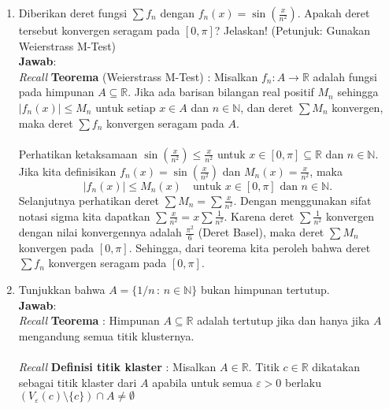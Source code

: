 \documentclass[a4paper, 12pt]{article}
\newcommand{\ans}{\textbf{Jawab}:}
\newcommand{\R}{\mathbb{R}}
\newcommand{\N}{\mathbb{N}}
\begin{document}
\begin{enumerate}
\begin{enumerate}
            \newpage
            \item Apakah $(f_n)$ konvergen seragam pada $A$? Jelaskan!\\
            \ans\\
             \textit{Recall} \textbf{Teorema} : Misalkan $f_n(x)$ adalah sebuah barisan fungsi kontinu pada suatu himpunan $A \subseteq \R$. Jika $(f_n)$ konvergen seragam pada $A$ ke fungsi $f : A \to \R$, maka $f$ kontinu pada $A$.\\
                
            Jelas bahwa $f_n(x)$ kontinu untuk $n\in\N$, hal ini diperoleh dari $g_n(x)=nx$ dan 
            $h_n(x)=1+nx^2\ne 0$ dimana kedua fungsi tersebut adalah fungsi polinom yang jelas kontinu pada $A\subseteq \R$, sehingga 
            $f_n(x)=g_n(x)/h_n(x)$ kontinu pada $A$ juga.
        \end{enumerate}

        \item Diberikan deret fungsi $\sum f_n$ dengan $f_n(x)=\sin(\frac{x}{n^2})$. Apakah deret tersebut konvergen seragam pada $[0,\pi]$? Jelaskan! (Petunjuk: Gunakan Weierstrass M-Test)\\
        \ans\\
        \textit{Recall} \textbf{Teorema} (Weierstrass M-Test) : Misalkan $f_n : A \to \R$ adalah fungsi pada himpunan $A \subseteq \R$. Jika ada barisan 
        bilangan real positif $M_n$ sehingga $|f_n(x)| \leq M_n$ untuk setiap $x \in A$ dan $n \in \N$, dan deret $\sum M_n$ konvergen, maka deret $\sum f_n$ konvergen seragam pada $A$.\\\\
        Perhatikan ketaksamaan $\sin(\frac{x}{n^2})\leq \frac{x}{n^2}$ untuk $x\in[0,\pi]\subseteq\R$ dan $n\in\N$.\\
        Jika kita definisikan $f_n(x)=\sin\left(\frac{x}{n^2}\right)$ dan $M_n(x)=\frac{x}{n^2}$, maka \[|f_n(x)|\leq M_n(x)\quad\text{untuk }x\in[0,\pi]\text{ dan }n\in\N.\]
        Selanjutnya perhatikan deret $\sum M_n=\sum\frac{x}{n^2}$. Dengan menggunakan sifat notasi sigma kita dapatkan $\sum\frac{x}{n^2}=x\sum\frac{1}{n^2}$. Karena deret $\sum\frac{1}{n^2}$ konvergen dengan nilai konvergennya adalah $\frac{\pi^2}{6}$ (Deret Basel), maka deret $\sum M_n$ konvergen pada $[0,\pi]$.
        Sehingga, dari teorema kita peroleh bahwa deret $\sum f_n$ konvergen seragam pada $[0,\pi]$.

    
       \item Tunjukkan bahwa $A=\{1/n\,:\,n\in \N\}$ bukan himpunan tertutup.\\
       \ans\\
       \textit{Recall} \textbf{Teorema} : Himpunan $A\subseteq\R$ adalah tertutup jika dan hanya jika $A$ mengandung semua titik klusternya.\\\\
       \textit{Recall} \textbf{Definisi titik klaster} : Misalkan $A \in \R$.  Titik $c \in \R $ dikatakan sebagai titik klaster dari $A$ apabila untuk semua $\varepsilon > 0 $ berlaku $(V_\varepsilon(c) \setminus \{c\}) \cap A \neq \emptyset $


\end{enumerate}
\end{document}

